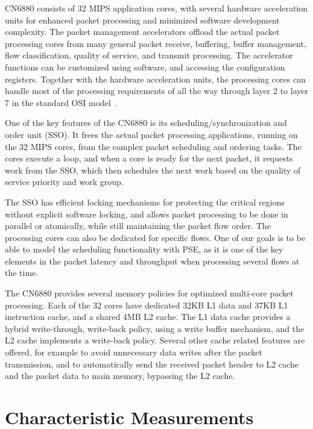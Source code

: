 CN6880 consists of 32 MIPS application cores, with several hardware acceleration units for enhanced packet processing and minimized software development complexity. The packet management accelerators offload the actual packet processing cores from many general packet receive, buffering, buffer management, flow classification, quality of service, and transmit processing. The accelerator functions can be customized using software, and accessing the configuration registers. Together with the hardware acceleration units, the processing cores can handle most of the processing requirements of all the way through layer 2 to layer 7 in the standard OSI model~\cite{ISO:1994:OSI}.~\cite{cavium:2010:fundamentals}

One of the key features of the CN6880 is its scheduling/synchronization and order unit (SSO). It frees the actual packet processing applications, running on the 32 MIPS cores, from the complex packet scheduling and ordering tasks. The cores execute a loop, and when a core is ready for the next packet, it requests work from the SSO, which then schedules the next work based on the quality of service priority and work group.~\cite{cavium:2010:fundamentals}

The SSO has efficient locking mechanisms for protecting the critical regions without explicit software locking, and allows packet processing to be done in parallel or atomically, while still maintaining the packet flow order. The processing cores can also be dedicated for specific flows. One of our goals is to be able to model the scheduling functionality with PSE, as it is one of the key elements in the packet latency and throughput when processing several flows at the time.~\cite{cavium:2010:fundamentals}


The CN6880 provides several memory policies for optimized multi-core packet processing. Each of the 32 cores have dedicated 32KB L1 data and 37KB L1 instruction cache, and a shared 4MB L2 cache. The L1 data cache provides a hybrid write-through, write-back policy, using a write buffer mechanism, and the L2 cache implements a write-back policy. Several other cache related features are offered, for example to avoid unnecessary data writes after the packet transmission, and to automatically send the received packet header to L2 cache and the packet data to main memory, bypassing the L2 cache.~\cite{cavium:2010:fundamentals}

\section{Characteristic Measurements}
\label{sec:characteristic-measurements}

